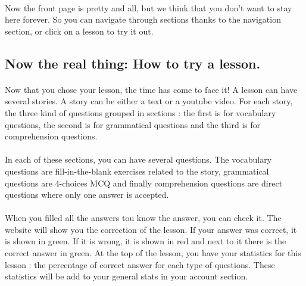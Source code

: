 \paragraph{}
Now the front page is pretty and all, but we think that you don't want to stay here forever. So you can navigate through sections thanks to the navigation section, or click on a lesson to try it out.

\subsection{Now the real thing: How to try a lesson.}

\paragraph{}
Now that you chose your lesson, the time has come to face it! A lesson can have several stories. A story can be either a text or a youtube video. For each story, the three kind of questions grouped in sections : the first is for vocabulary questions, the second is for grammatical questions and the third is for comprehension questions.

\paragraph{}
In each of these sections, you can have several questions. The vocabulary questions are fill-in-the-blank exercises related to the story, grammatical questions are 4-choices MCQ and finally comprehension questions are direct questions where only one answer is accepted.

\paragraph{}
When you filled all the answers tou know the answer, you can check it. The website will show you the correction of the lesson. If your answer was correct, it is shown in green. If it is wrong, it is shown in red and next to it there is the correct answer in green. \linebreak
At the top of the lesson, you have your statistics for this lesson : the percentage of correct answer for each type of questions. These statistics will be add to your general stats in your account section.

